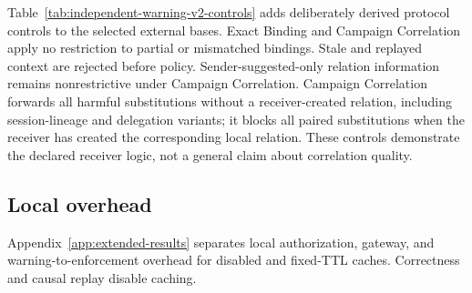 Table~\ref{tab:independent-warning-v2-controls} adds deliberately derived protocol controls to the selected external bases. Exact Binding and Campaign Correlation apply no restriction to partial or mismatched bindings. Stale and replayed context are rejected before policy. Sender-suggested-only relation information remains nonrestrictive under Campaign Correlation. Campaign Correlation forwards all \ExternalWarningVTwoNoRelationCTwoEForwarded{} harmful substitutions without a receiver-created relation, including \ExternalWarningVTwoSessionNoRelationForwarded{} session-lineage and \ExternalWarningVTwoDelegationNoRelationForwarded{} delegation variants; it blocks all \ExternalWarningVTwoWithRelationCTwoEBlocked{} paired substitutions when the receiver has created the corresponding local relation. These controls demonstrate the declared receiver logic, not a general claim about correlation quality.





\subsection{Local overhead}

Appendix~\ref{app:extended-results} separates local authorization, gateway, and warning-to-enforcement overhead for disabled and fixed-TTL caches. Correctness and causal replay disable caching.
